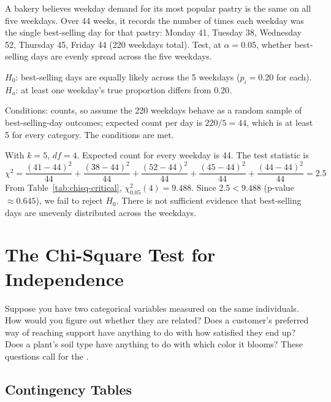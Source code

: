 \begin{Exercise}[title={Goodness-of-Fit Test for a Bakery}, label={ex:chisq-gof-bakery}]
A bakery believes weekday demand for its most popular pastry is the same on all five weekdays. Over 44 weeks, it records the number of times each weekday was the single best-selling day for that pastry: Monday 41, Tuesday 38, Wednesday 52, Thursday 45, Friday 44 (220 weekdays total). Test, at $\alpha = 0.05$, whether best-selling days are evenly spread across the five weekdays.
\end{Exercise}

\begin{Answer}[ref={ex:chisq-gof-bakery}]
$H_0$: best-selling days are equally likely across the 5 weekdays ($p_i = 0.20$ for each). $H_a$: at least one weekday's true proportion differs from 0.20.

Conditions: counts, so assume the 220 weekdays behave as a random sample of best-selling-day outcomes; expected count per day is $220/5 = 44$, which is at least 5 for every category. The conditions are met.

With $k = 5$, $df = 4$. Expected count for every weekday is 44. The test statistic is
\[
\chi^2 = \frac{(41-44)^2}{44} + \frac{(38-44)^2}{44} + \frac{(52-44)^2}{44} + \frac{(45-44)^2}{44} + \frac{(44-44)^2}{44} = 2.5
\]
From Table~\ref{tab:chisq-critical}, $\chi^2_{0.05}(4) = 9.488$. Since $2.5 < 9.488$ (p-value $\approx 0.645$), we fail to reject $H_0$. There is not sufficient evidence that best-selling days are unevenly distributed across the weekdays.
\end{Answer}


\section{The Chi-Square Test for Independence}

Suppose you have two categorical variables measured on the same individuals. How would you figure out whether they are related? Does a customer's preferred way of reaching support have anything to do with how satisfied they end up? Does a plant's soil type have anything to do with which color it blooms? These questions call for the .

\subsection{Contingency Tables}

